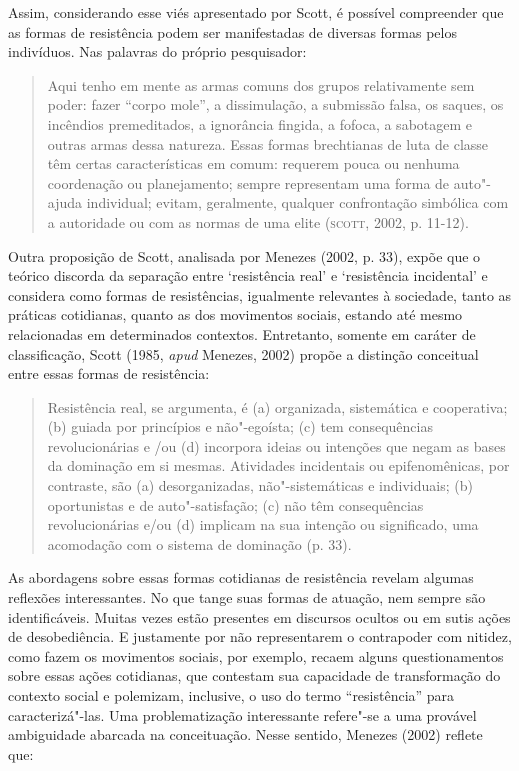Assim, considerando esse viés apresentado por Scott, é possível
compreender que as formas de resistência podem ser manifestadas de
diversas formas pelos indivíduos. Nas palavras do próprio pesquisador:

\begin{quote}
Aqui tenho em mente as armas comuns dos grupos relativamente sem poder:
fazer ``corpo mole'', a dissimulação, a submissão falsa, os saques, os
incêndios premeditados, a ignorância fingida, a fofoca, a sabotagem e
outras armas dessa natureza. Essas formas brechtianas de luta de classe
têm certas características em comum: requerem pouca ou nenhuma
coordenação ou planejamento; sempre representam uma forma de auto"-ajuda
individual; evitam, geralmente, qualquer confrontação simbólica com a
autoridade ou com as normas de uma elite (\textsc{scott}, 2002, p. 11-12).
\end{quote}

Outra proposição de Scott, analisada por Menezes (2002, p. 33), expõe que o
teórico discorda da separação entre `resistência real' e `resistência
incidental' e considera como formas de resistências, igualmente
relevantes à sociedade, tanto as práticas cotidianas, quanto as dos
movimentos sociais, estando até mesmo relacionadas em determinados
contextos. Entretanto, somente em caráter de classificação, Scott (1985,
\emph{apud} Menezes, 2002) propõe a distinção conceitual entre essas
formas de resistência:

\begin{quote}
Resistência real, se argumenta, é (a) organizada, sistemática e
cooperativa; (b) guiada por princípios e não"-egoísta; (c) tem
consequências revolucionárias e /ou (d) incorpora ideias ou intenções
que negam as bases da dominação em si mesmas. Atividades incidentais ou
epifenomênicas, por contraste, são (a) desorganizadas, não"-sistemáticas
e individuais; (b) oportunistas e de auto"-satisfação; (c) não têm
consequências revolucionárias e/ou (d) implicam na sua intenção ou
significado, uma acomodação com o sistema de dominação (p. 33).
\end{quote}

As abordagens sobre essas formas cotidianas de resistência revelam
algumas reflexões interessantes. No que tange suas formas de atuação,
nem sempre são identificáveis. Muitas vezes estão presentes em discursos
ocultos ou em sutis ações de desobediência. E justamente por não
representarem o contrapoder com nitidez, como fazem os movimentos
sociais, por exemplo, recaem alguns questionamentos sobre essas ações
cotidianas, que contestam sua capacidade de transformação do contexto
social e polemizam, inclusive, o uso do termo ``resistência'' para
caracterizá"-las. Uma problematização interessante refere"-se a uma
provável ambiguidade abarcada na conceituação. Nesse sentido, Menezes
(2002) reflete que:

